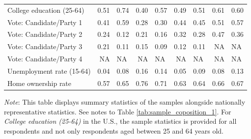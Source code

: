 \begin{table}[h!]
{{\begin{tabular}[t]{lrlrlrlrl}
    \addlinespace
    College education (25-64) & 0.51 & 0.74 & 0.40 & 0.57 & 0.49 & 0.51 & 0.61 & 0.60\\
    \addlinespace
    Vote: Candidate/Party 1 & 0.41 & 0.59 & 0.28 & 0.30 & 0.44 & 0.45 & 0.51 & 0.57\\
    Vote: Candidate/Party 2 & 0.24 & 0.12 & 0.21 & 0.16 & 0.32 & 0.28 & 0.47 & 0.36\\
    Vote: Candidate/Party 3 & 0.21 & 0.11 & 0.15 & 0.09 & 0.12 & 0.11 & NA & NA\\
    Vote: Candidate/Party 4 & NA & NA & NA & NA & NA & NA & NA & NA\\
    \addlinespace
    Unemployment rate (15-64) & 0.04 & 0.08 & 0.16 & 0.14 & 0.05 & 0.09 & 0.08 & 0.13\\
    \addlinespace
    Home ownership rate & 0.57 & 0.65 & 0.76 & 0.71 & 0.63 & 0.64 & 0.66 & 0.67\\
    \bottomrule
    \end{tabular}
            }
        } \label{tab:sample_composition_3}
        {\footnotesize \textit{Note}: This table displays summary statistics of the samples alongside nationally representative statistics. See notes to Table \ref{tab:sample_coposition_1}. For \textit{College education (25-64)} in the U.S., the sample statistics is provided for all respondents and not only respondents aged between 25 and 64 years old.}
    \end{table}
    

